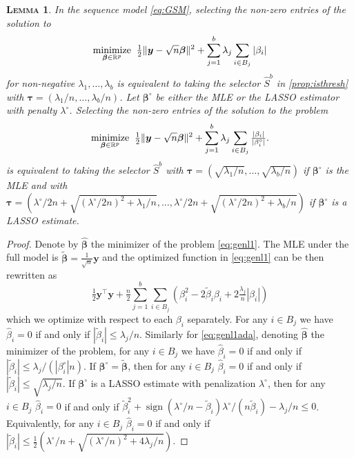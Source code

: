 \documentclass[bj,authoryear]{imsart}
\theoremstyle{plain}
\newtheorem{lem}[thm]{\textsc{Lemma}}
\newcommand{\R}{\mathbb{R}}
\newcommand{\bs}{\boldsymbol}
\begin{document}
\begin{lem}\label{lem:l1isthreshold}
	In the sequence model \eqref{eq:GSM}, selecting the non-zero entries  of the solution to 
\begin{equation}\label{eq:genl1}
	\underset{\bs \beta \in \R^p}{\rm minimize} \;\;\tfrac12\|\bs y-\sqrt{n}\bs\beta\|^2+\sum_{j=1}^b \lambda_j \sum_{i \in B_j}|\beta_{i}|
\end{equation}
for non-negative $\lambda_1,\ldots,\lambda_b$  is equivalent to taking the selector $\hat S^{b}$ in \eqref{prop:isthresh} with $\bs \tau=(\lambda_1/n,\ldots,\lambda_b/n)$. Let $\bs\beta^\circ$ be either the MLE or the LASSO estimator with penalty $\lambda^\circ$. Selecting the non-zero entries of the solution to the problem
\begin{equation}\label{eq:genl1ada}
	\underset{\bs \beta \in \R^p}{\rm minimize} \;\;\tfrac12\|\bs y-\sqrt{n}\bs\beta\|^2+\sum_{j=1}^b \lambda_j \sum_{i \in B_j}\tfrac{|\beta_{i}|}{|\beta_i^\circ|}.
\end{equation}
is equivalent to taking the selector $\hat S^{b}$ with $\bs \tau=(\sqrt{\lambda_1/n},\ldots,\sqrt{\lambda_b/n})$ if $\bs\beta^\circ$ is the MLE and with $\bs \tau=(\lambda^\circ/2n+\sqrt{(\lambda^\circ/2n)^2+\lambda_1/n},\ldots,\lambda^\circ/2n+\sqrt{(\lambda^\circ/2n)^2+\lambda_b/n})$ if $\bs\beta^\circ$ is a LASSO estimate.
\end{lem}

\begin{proof}
    Denote by $\hat{\bs \beta}$ the minimizer of the problem \eqref{eq:genl1}. The MLE under the full model is $\tilde{\bs\beta}=\tfrac{1}{\sqrt{n}} \bs y$ and the optimized function in \eqref{eq:genl1} can be then rewritten as
	$$
	\tfrac{1}{2}\bs y^{\top}\bs y +\tfrac{n}{2}\sum_{j=1}^b\sum_{i\in B_j}\left(\beta_i^2-2\tilde\beta_i\beta_i+2\tfrac{\lambda_j}{n}|\beta_i|\right)
	$$
	which we optimize with respect to each $\beta_i$ separately. For any $i\in B_j$ we have $\hat\beta_i=0$ if and only if $|\tilde \beta_i|\leq \lambda_j/n$. Similarly  for \eqref{eq:genl1ada}, denoting $\hat{\bs \beta}$ the minimizer of the problem, for any $i\in B_j$ we have $\hat\beta_i=0$ if and only if $|\tilde \beta_i|\leq \lambda_j/(|\beta^{\circ}_i|n)$. If $\bs \beta^{\circ}= \tilde{\bs\beta}$, then for any $i\in B_j$ $\hat{\beta}_i = 0$ if and only if $|\tilde \beta_i|\leq \sqrt{\lambda_j/n}$. If $\bs\beta^\circ$ is a LASSO estimate with penalization $\lambda^\circ$, then for any $i\in B_j$ 
 $\hat{\beta}_i = 0$ if and only if $\tilde{\beta}^2_i + \operatorname{sign}(\lambda^{\circ}/n-\tilde{\beta}_i)\lambda^\circ/(n\tilde{\beta}_i)-\lambda_j/n \leq 0$. Equivalently, for any $i\in B_j$ 
 $\hat{\beta}_i = 0$ if and only if $|\tilde{\beta}_ i| \leq  \tfrac{1}{2}\left(\lambda^\circ/n+\sqrt{(\lambda^\circ/n)^2+4 \lambda_j/n}\right)$.
\end{proof}
\end{document}
